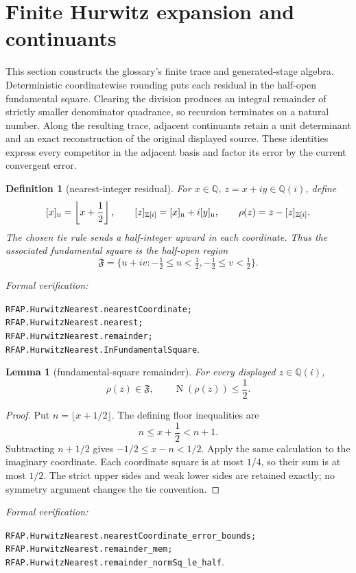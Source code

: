 \documentclass[11pt]{article}
\newtheorem{lemma}[lemma]{Lemma}
\newtheorem{definition}[definition]{Definition}
\newcommand{\Qi}{\mathbb{Q}(i)}
\newcommand{\Zi}{\mathbb{Z}[i]}
\newcommand{\Q}{\mathbb{Q}}
\newcommand{\Norm}[1]{\operatorname{N}\!\left(#1\right)}
\newcommand{\leanref}[1]{\par\smallskip\noindent
  \emph{Formal verification:}\par\nobreak
  {\raggedright\nolinkurl{#1}.\par}}
\begin{document}
\section{Finite Hurwitz expansion and continuants}
\label{sec:hurwitz-trace}

This section constructs the glossary's finite trace and generated-stage
algebra.  Deterministic coordinatewise rounding puts each residual in the
half-open fundamental square.  Clearing the division produces an integral
remainder of strictly smaller denominator quadrance, so recursion terminates
on a natural number.  Along the resulting trace, adjacent continuants retain
a unit determinant and an exact reconstruction of the original displayed
source.  These identities express every competitor in the adjacent basis and
factor its error by the current convergent error.

\begin{definition}[nearest-integer residual]
\label{def:nearest-residual}
For $x\in\Q$, $z=x+iy\in\Qi$, define
\[
 [x]_{\rm n}=\left\lfloor x+\frac12\right\rfloor,
 \qquad [z]_{\Zi}=[x]_{\rm n}+i[y]_{\rm n},
 \qquad \rho(z)=z-[z]_{\Zi}.
\]
The chosen tie rule sends a half-integer upward in each coordinate.  Thus the
associated fundamental square is the half-open region
\[
 \mathfrak F=\{u+iv:-\tfrac12\le u<\tfrac12,
                         -\tfrac12\le v<\tfrac12\}.
\]
\end{definition}

\leanref{RFAP.HurwitzNearest.nearestCoordinate;
RFAP.HurwitzNearest.nearest;
RFAP.HurwitzNearest.remainder;
RFAP.HurwitzNearest.InFundamentalSquare}

\begin{lemma}[fundamental-square remainder]
\label{lem:fundamental-square-remainder}
For every displayed $z\in\Qi$,
\[
              \rho(z)\in\mathfrak F,
              \qquad \Norm{\rho(z)}\le\frac12.
\]
\end{lemma}

\begin{proof}
Put $n=\lfloor x+1/2\rfloor$.  The defining floor inequalities are
\[
                     n\le x+\frac12<n+1.
\]
Subtracting $n+1/2$ gives
$-1/2\le x-n<1/2$.  Apply the same calculation to the imaginary coordinate.
Each coordinate square is at most $1/4$, so their sum is at most $1/2$.
The strict upper sides and weak lower sides are retained exactly; no symmetry
argument changes the tie convention.
\end{proof}

\leanref{RFAP.HurwitzNearest.nearestCoordinate_error_bounds;
RFAP.HurwitzNearest.remainder_mem;
RFAP.HurwitzNearest.remainder_normSq_le_half}
\end{document}
